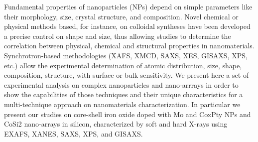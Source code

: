 Fundamental properties of nanoparticles (NPs) depend on simple parameters like
their morphology, size, crystal structure, and composition. Novel chemical or
physical methods based, for instance, on colloidal syntheses have been developed
a precise control on shape and size, thus allowing studies to determine the
correlation between physical, chemical and structural properties in
nanomaterials. Synchrotron-based methodologies (XAFS, XMCD, SAXS, XES, GISAXS,
XPS, etc.) allow the experimental determination of atomic distribution, size,
shape, composition, structure, with surface or bulk sensitivity. We present here
a set of experimental analysis on complex nanoparticles and nano-arrrays in
order to show the capabilities of those techniques and their unique
characteristics for a multi-technique approach on nanomaterials
characterization. In particular we present our studies on core-shell iron oxide
doped with Mo and CoxPty NPs and CoSi2 nano-arrays in silicon, characterized by
soft and hard X-rays using EXAFS, XANES, SAXS, XPS, and GISAXS.
